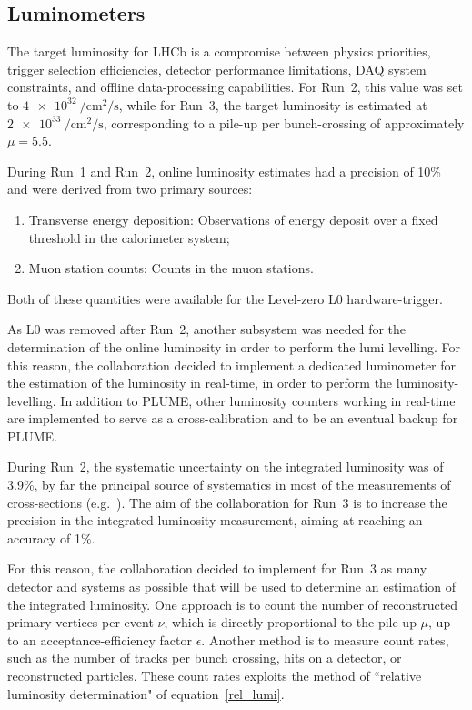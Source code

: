 \subsection{Luminometers}\label{sec:luminometers}
The target luminosity for LHCb is a compromise between physics priorities, trigger selection efficiencies, detector performance limitations, DAQ system constraints, and offline data-processing capabilities. For Run~2, this value was set to $\SI{4e32}{\per\centi\meter\squared\per\second}$, while for Run~3, the target luminosity is estimated at $\SI{2e33}{\per\centi\meter\squared\per\second}$, corresponding to a pile-up per bunch-crossing of approximately $\mu = 5.5$.

During Run~1 and Run~2, online luminosity estimates had a precision of 10\% and were derived from two primary sources: 
\begin{enumerate}
    \item Transverse energy deposition: Observations of energy deposit over a fixed threshold in the calorimeter system;
    \item Muon station counts: Counts in the muon stations.
\end{enumerate}
Both of these quantities were available for the Level-zero L$0$ hardware-trigger.

As L$0$ was removed after Run~2, another subsystem was needed for the determination of the online luminosity in order to perform the lumi levelling. For this reason, the collaboration decided to implement a dedicated luminometer for the estimation of the luminosity in real-time, in order to perform the luminosity-levelling. In addition to PLUME, other luminosity counters working in real-time are implemented to serve as a cross-calibration and to be an eventual backup for PLUME.

During Run~2, the systematic uncertainty on the integrated luminosity was of 3.9\%, by far the principal source of systematics in most of the measurements of cross-sections (e.g.~\cite{j-psi}). The aim of the collaboration for Run~3 is to increase the precision in the integrated luminosity measurement, aiming at reaching an accuracy of 1\%\cite{Aaij:1951625}. 

For this reason, the collaboration decided to implement for Run~3 as many detector and systems as possible that will be used to determine an estimation of the integrated luminosity.
One approach is to count the number of reconstructed primary vertices per event $\nu$, which is directly proportional to the pile-up $\mu$, up to an acceptance-efficiency factor $\epsilon$. Another method is to measure count rates, such as the number of tracks per bunch crossing, hits on a detector, or reconstructed particles. These count rates exploits the method of ``relative luminosity determination" of equation~\eqref{rel_lumi}.

